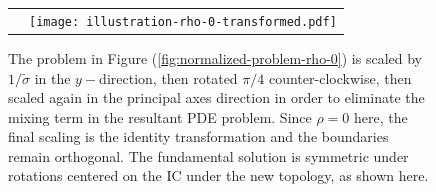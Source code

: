 \documentclass[10pt]{article}
\begin{document}
\begin{figure}
\begin{tabular}{cc}
\begin{minipage}{0.40\textwidth}
      \label{fig:normalized-problem-rho-0}
    \end{minipage}
    & \begin{minipage}{0.40\textwidth}
      \centering
      \texttt{[image: illustration-rho-0-transformed.pdf]}
      \caption{The problem in Figure
        (\ref{fig:normalized-problem-rho-0}) is scaled by
        $1/\tilde{\sigma}$ in the $y-$direction, then rotated $\pi/4$
        counter-clockwise, then scaled again in the principal axes
        direction in order to eliminate the mixing term in the
        resultant PDE problem. Since $\rho=0$ here, the final scaling
        is the identity transformation and the boundaries remain
        orthogonal. The fundamental solution is symmetric under
        rotations centered on the IC under the new topology, as shown
        here.}
      \label{fig:transformed-problem-rho-0}
    \end{minipage}
  \end{tabular}
\end{figure}
\end{document}
